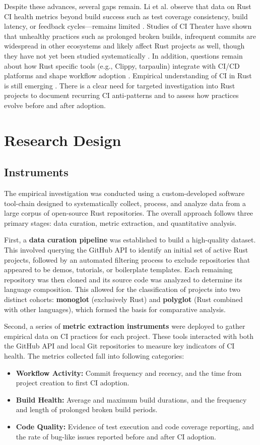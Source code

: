 \documentclass[11pt]{article}
\begin{document}
Despite these advances, several gaps remain. Li et al. observe that data on Rust CI health metrics beyond build success such as test coverage consistency, build latency, or feedback cycles—remains limited \autocite{Li2024}. Studies of CI Theater have shown that unhealthy practices such as prolonged broken builds, infrequent commits are widespread in other ecosystems and likely affect Rust projects as well, though they have not yet been studied systematically \autocite{felidre2019ci_theater}. In addition, questions remain about how Rust specific tools (e.g., Clippy, tarpaulin) integrate with CI/CD platforms and shape workflow adoption \autocite{RustInternals2015}. Empirical understanding of CI in Rust is still emerging \autocite{Bugden2022}. There is a clear need for targeted investigation into Rust projects to document recurring CI anti-patterns and to assess how practices evolve before and after adoption.

\section{Research Design}

\subsection{Instruments}
The empirical investigation was conducted using a custom-developed software tool-chain designed to systematically collect, process, and analyze data from a large corpus of open-source Rust repositories. The overall approach follows three primary stages: data curation, metric extraction, and quantitative analysis.

First, a \textbf{data curation pipeline} was established to build a high-quality dataset. This involved querying the GitHub API to identify an initial set of active Rust projects, followed by an automated filtering process to exclude repositories that appeared to be demos, tutorials, or boilerplate templates. Each remaining repository was then cloned and its source code was analyzed to determine its language composition. This allowed for the classification of projects into two distinct cohorts: \textbf{monoglot} (exclusively Rust) and \textbf{polyglot} (Rust combined with other languages), which formed the basis for comparative analysis.

Second, a series of \textbf{metric extraction instruments} were deployed to gather empirical data on CI practices for each project. These tools interacted with both the GitHub API and local Git repositories to measure key indicators of CI health. The metrics collected fall into following categories:
\begin{itemize}
\item \textbf{Workflow Activity:} Commit frequency and recency, and the time from project creation to first CI adoption.
\item \textbf{Build Health:} Average and maximum build durations, and the frequency and length of prolonged broken build periods.
\item \textbf{Code Quality:} Evidence of test execution and code coverage reporting, and the rate of bug-like issues reported before and after CI adoption.
\end{itemize}
\end{document}
